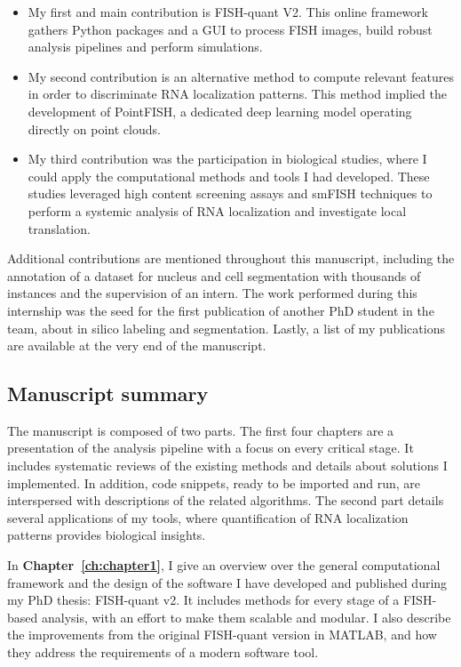\begin{itemize}
	\setlength\itemsep{0.1em}
	\item My first and main contribution is FISH-quant V2.
	This online framework gathers Python packages and a \ac{GUI} to process \ac{FISH} images, build robust analysis pipelines and perform simulations.
	\item My second contribution is an alternative method to compute relevant features in order to discriminate \ac{RNA} localization patterns.
	This method implied the development of PointFISH, a dedicated deep learning model operating directly on point clouds.
	\item My third contribution was the participation in biological studies, where I could apply the computational methods and tools I had developed.
	These studies leveraged high content screening assays and \ac{smFISH} techniques to perform a systemic analysis of \ac{RNA} localization and investigate local translation.
\end{itemize}

\noindent
Additional contributions are mentioned throughout this manuscript, including the annotation of a dataset for nucleus and cell segmentation with thousands of instances and the supervision of an intern.
The work performed during this internship was the seed for the first publication of another PhD student in the team, about in silico labeling and segmentation.
Lastly, a list of my publications are available at the very end of the manuscript.

\subsection{Manuscript summary}
\label{subsec:intro_manuscript}

The manuscript is composed of two parts.
The first four chapters are a presentation of the analysis pipeline with a focus on every critical stage.
It includes systematic reviews of the existing methods and details about solutions I implemented.
In addition, code snippets, ready to be imported and run, are interspersed with descriptions of the related algorithms.
The second part details several applications of my tools, where quantification of \ac{RNA} localization patterns provides biological insights.

In \textbf{Chapter~\ref{ch:chapter1}}, I give an overview over the general computational framework and the design of the software I have developed and published during my PhD thesis: FISH-quant v2.
It includes methods for every stage of a \ac{FISH}-based analysis, with an effort to make them scalable and modular.
I also describe the improvements from the original FISH-quant version in MATLAB, and how they address the requirements of a modern software tool.

